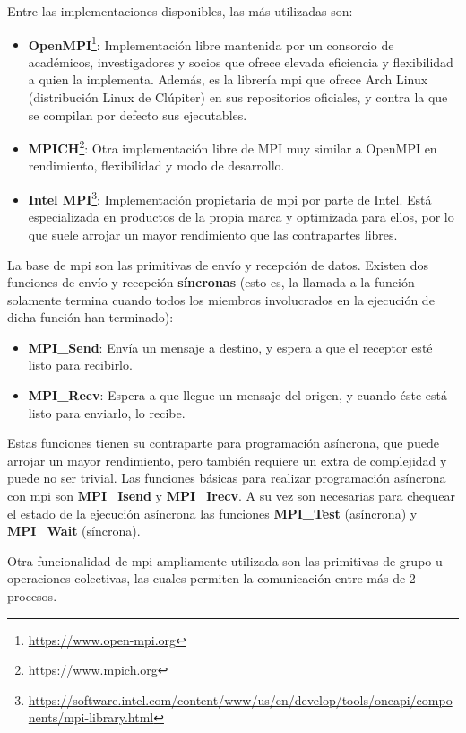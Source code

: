 Entre las implementaciones disponibles, las más utilizadas son:
\begin{itemize}
  \item\textbf{OpenMPI}\footnote{\url{https://www.open-mpi.org}}: Implementación libre mantenida por un consorcio de académicos, investigadores y socios que ofrece elevada eficiencia y flexibilidad a quien la implementa. Además, es la librería \acrshort{mpi} que ofrece Arch Linux (distribución Linux de Clúpiter) en sus repositorios oficiales, y contra la que se compilan por defecto sus ejecutables.
  \item\textbf{MPICH}\footnote{\url{https://www.mpich.org}}: Otra implementación libre de MPI muy similar a OpenMPI en rendimiento, flexibilidad y modo de desarrollo.
  \item\textbf{Intel MPI}\footnote{\url{https://software.intel.com/content/www/us/en/develop/tools/oneapi/components/mpi-library.html}}: Implementación propietaria de \acrshort{mpi} por parte de Intel. Está especializada en productos de la propia marca y optimizada para ellos, por lo que suele arrojar un mayor rendimiento que las contrapartes libres.
\end{itemize}

La base de \acrshort{mpi} son las primitivas de envío y recepción de datos. Existen dos funciones de envío y recepción \textbf{síncronas} (esto es, la llamada a la función solamente termina cuando todos los miembros involucrados en la ejecución de dicha función han terminado):
\begin{itemize}
  \item \textbf{MPI\_Send}: Envía un mensaje a destino, y espera a que el receptor esté listo para recibirlo. 
  \item \textbf{MPI\_Recv}: Espera a que llegue un mensaje del origen, y cuando éste está listo para enviarlo, lo recibe.
\end{itemize}

Estas funciones tienen su contraparte para programación asíncrona, que puede arrojar un mayor rendimiento, pero también requiere un extra de complejidad y puede no ser trivial. Las funciones básicas para realizar programación asíncrona con \acrshort{mpi} son \textbf{MPI\_Isend} y \textbf{MPI\_Irecv}. A su vez son necesarias para chequear el estado de la ejecución asíncrona las funciones \textbf{MPI\_Test} (asíncrona) y \textbf{MPI\_Wait} (síncrona).

Otra funcionalidad de \acrshort{mpi} ampliamente utilizada son las primitivas de grupo u operaciones colectivas, las cuales permiten la comunicación entre más de 2 procesos.

